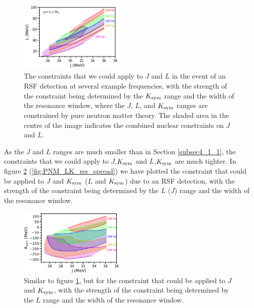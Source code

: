 \documentclass[fleqn,usenatbib]{mnras}
\begin{document}
\begin{figure}
\centering
\includegraphics[width=0.45\textwidth,angle=0]{PNM_JL_res_spread_v2}
\caption{The constraints that we could apply to $J$ and $L$ in the event of an RSF detection at several example frequencies, with the strength of the constraint being determined by the $K_{\rm sym}$ range and the width of the resonance window, where the $J$, $L$, and $K_{\rm sym}$ ranges are constrained by pure neutron matter theory. The shaded area in the centre of the image indicates the combined nuclear constraints on $J$ and $L$.}
\label{fig:PNM_JL_res_spread}
\end{figure}

As the $J$ and $L$ ranges are much smaller than in Section \ref{subsec4_1_1}, the constraints that we could apply to $J$,$K_{\rm sym}$ and $L$,$K_{\rm sym}$ are much tighter. In figure \ref{fig:PNM_JK_res_spread} (\ref{fig:PNM_LK_res_spread}) we have plotted the constraint that could be applied to $J$ and $K_{\rm sym}$ ($L$ and $K_{\rm sym}$) due to an RSF detection, with the strength of the constraint being determined by the $L$ ($J$) range and the width of the resonance window.

\begin{figure}
\centering
\includegraphics[width=0.45\textwidth,angle=0]{PNM_JK_Ldfspread.png}
\caption{Similar to figure \ref{fig:PNM_JL_res_spread}, but for the constraint that could be applied to $J$ and $K_{\rm sym}$, with the strength of the constraint being determined by the $L$ range and the width of the resonance window.}
\label{fig:PNM_JK_res_spread}
\end{figure}
\end{document}
